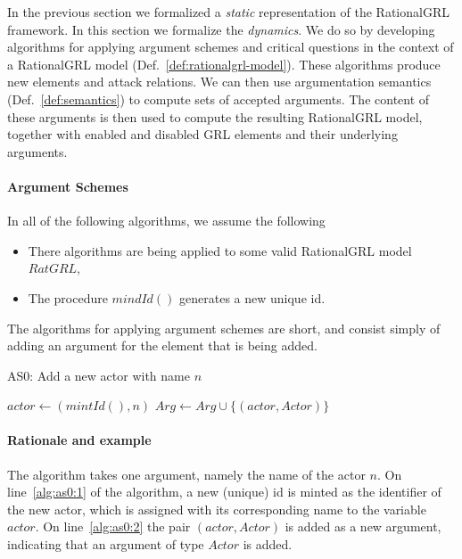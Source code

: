 In the previous section we formalized a \emph{static} representation of the RationalGRL framework. In this section we formalize the \emph{dynamics}. We do so by developing algorithms for applying argument schemes and critical questions in the context of a RationalGRL model (Def.~\ref{def:rationalgrl-model}). These algorithms produce new elements and attack relations. We can then use argumentation semantics (Def.~\ref{def:semantics}) to compute sets of accepted arguments. The content of these arguments is then used to compute the resulting RationalGRL model, together with enabled and disabled GRL elements and their underlying arguments.

\paragraph{Argument Schemes}

In all of the following algorithms, we assume the following
\begin{itemize}
\item There algorithms are being applied to some valid RationalGRL model $RatGRL$,
\item The procedure $mindId()$ generates a new unique id.
\end{itemize}

The algorithms for applying argument schemes are short, and consist simply of adding an argument for the element that is being added.

\begin{algorithm}[h]
  \caption{AS0: Add a new actor with name $n$}\label{alg:as0}
  \begin{algorithmic}[1]
    \State $actor \leftarrow (mintId(), n)$ \label{alg:as0:1}
    \State $Arg\leftarrow Arg \cup \{(actor,Actor)\}$\label{alg:as0:2}
    \EndProcedure
  \end{algorithmic}
\end{algorithm}

\paragraph{Rationale and example} The algorithm takes one argument, namely the name of the actor $n$. On line~\ref{alg:as0:1} of the algorithm, a new (unique) id is minted as the identifier of the new actor, which is assigned with its corresponding name to the variable $actor$. On line~\ref{alg:as0:2} the pair $(actor,Actor)$ is added as a new argument, indicating that an argument of type $Actor$ is added.

